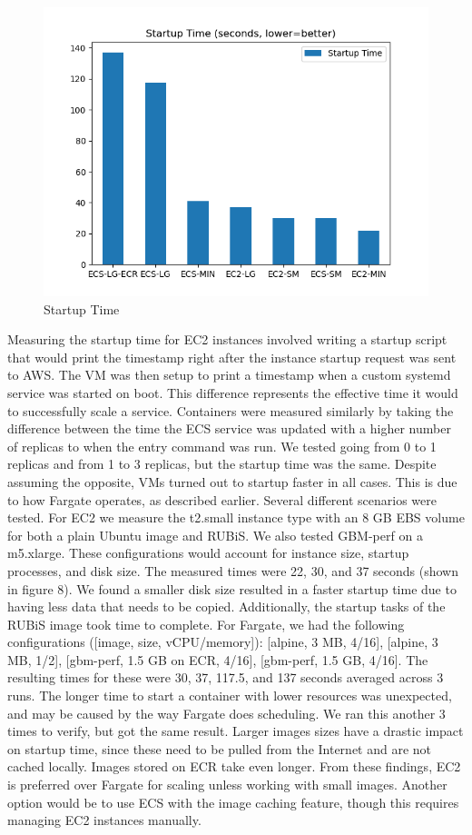 \documentclass[11pt]{article}
\begin{document}
\begin{figure}[H]
  \centering
    \includegraphics[width=0.55\linewidth]{startup_time.png}
    \caption{Startup Time}
    \label{fig:disk}
\end{figure}

Measuring the startup time for EC2 instances involved writing a startup script that would print the timestamp right after the instance startup request was sent to AWS. The VM was then setup to print a timestamp when a custom systemd service was started on boot. This difference represents the effective time it would to successfully scale a service. Containers were measured similarly by taking the difference between the time the ECS service was updated with a higher number of replicas to when the entry command was run. We tested going from 0 to 1 replicas and from 1 to 3 replicas, but the startup time was the same. Despite assuming the opposite, VMs turned out to startup faster in all cases. This is due to how Fargate operates, as described earlier. Several different scenarios were tested. For EC2 we measure the t2.small instance type with an 8 GB EBS volume for both a plain Ubuntu image and RUBiS. We also tested GBM-perf on a m5.xlarge. These configurations would account for instance size, startup processes, and disk size. The measured times were 22, 30, and 37 seconds (shown in figure 8). We found a smaller disk size resulted in a faster startup time due to having less data that needs to be copied. Additionally, the startup tasks of the RUBiS image took time to complete. For Fargate, we had the following configurations ([image, size, vCPU/memory]): [alpine, 3 MB, 4/16], [alpine, 3 MB, 1/2], [gbm-perf, 1.5 GB on ECR, 4/16], [gbm-perf, 1.5 GB, 4/16]. The resulting times for these were 30, 37, 117.5, and 137 seconds averaged across 3 runs. The longer time to start a container with lower resources was unexpected, and may be caused by the way Fargate does scheduling. We ran this another 3 times to verify, but got the same result. Larger images sizes have a drastic impact on startup time, since these need to be pulled from the Internet and are not cached locally. Images stored on ECR take even longer. From these findings, EC2 is preferred over Fargate for scaling unless working with small images. Another option would be to use ECS with the image caching feature, though this requires managing EC2 instances manually.
\end{document}
